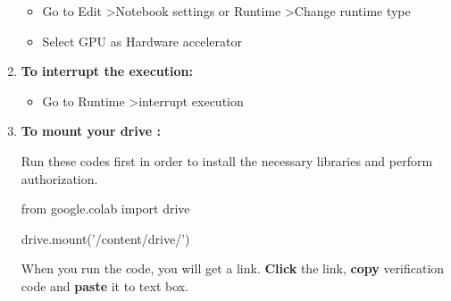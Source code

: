 \documentclass{book}
\begin{document}
\begin{enumerate}
	\begin{itemize}
		\item Go to Edit \textgreater Notebook settings or Runtime \textgreater Change runtime type
		\item Select GPU as Hardware accelerator
	\end{itemize}
\item \textbf{To interrupt the execution:}
	\begin{itemize}
		\item Go to Runtime \textgreater interrupt execution
	\end{itemize}
\item \textbf{To mount your drive :}

 Run these codes first in order to install the necessary libraries and perform authorization. \\
			\begin{center} from google.colab import drive \end{center} 
				\begin{center}drive.mount('/content/drive/') \end{center}
					When you run the code, you will get a link. \textbf{Click} the link, \textbf{copy} verification code and \textbf{paste} it to text box. 


\end{enumerate}
\end{document}
